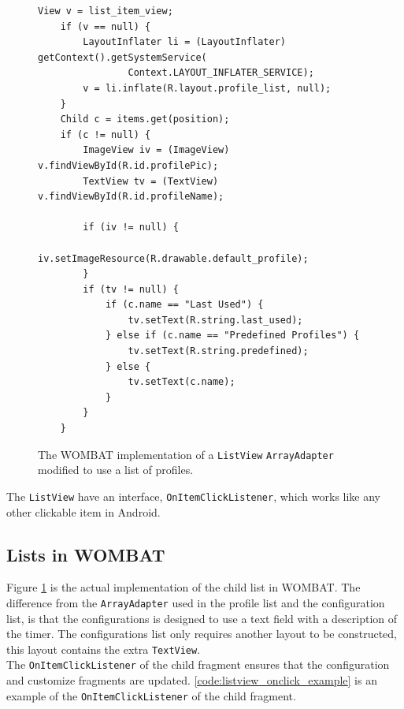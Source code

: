 \begin{figure}[H]
	\centering
	\begin{lstlisting}
View v = list_item_view;
	if (v == null) {
		LayoutInflater li = (LayoutInflater) getContext().getSystemService(
				Context.LAYOUT_INFLATER_SERVICE);
		v = li.inflate(R.layout.profile_list, null);
	}
	Child c = items.get(position);
	if (c != null) {
		ImageView iv = (ImageView) v.findViewById(R.id.profilePic);
		TextView tv = (TextView) v.findViewById(R.id.profileName);

		if (iv != null) {
			iv.setImageResource(R.drawable.default_profile);
		}
		if (tv != null) {
			if (c.name == "Last Used") {
				tv.setText(R.string.last_used);
			} else if (c.name == "Predefined Profiles") {
				tv.setText(R.string.predefined);
			} else {
				tv.setText(c.name);
			}
		}
	}
\end{lstlisting}
	\caption{The WOMBAT implementation of a \texttt{ListView} \texttt{ArrayAdapter} modified to use a list of profiles.}
	\label{code:listview_adapter_example}
\end{figure}

The \texttt{ListView} have an interface, \texttt{OnItemClickListener}, which works like any other clickable item in Android.

\subsection{Lists in WOMBAT}
Figure \ref{code:listview_adapter_example} is the actual implementation of the child list in WOMBAT. The difference from the \texttt{ArrayAdapter} used in the profile list and the configuration list, is that the configurations is designed to use a text field with a description of the timer.
The configurations list only requires another layout to be constructed, this layout contains the extra \texttt{TextView}.\\

The \texttt{OnItemClickListener} of the child fragment ensures that the configuration and customize fragments are updated. \autoref{code:listview_onclick_example} is an example of the \texttt{OnItemClickListener} of the child fragment.

